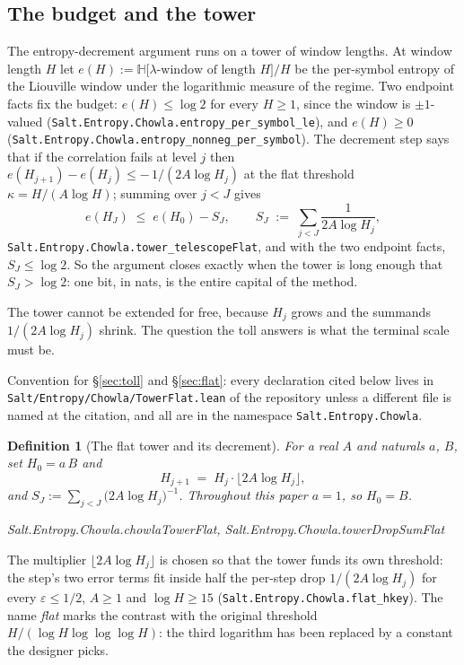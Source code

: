 \documentclass[11pt]{amsart}
\newcommand{\leanname}[1]{\par{\noindent\small\ttfamily\raggedright #1\par}}
\newcommand{\leaninline}[1]{{\small\texttt{#1}}}
\newtheorem{definition}[theorem]{Definition}
\theoremstyle{remark}
\begin{document}
\subsection{The budget and the tower}
The entropy-decrement argument runs on a tower of window lengths. At
window length $H$ let
$e(H) := \mathbb{H}\bigl[\lambda\text{-window of length } H\bigr]/H$
be the per-symbol entropy of the Liouville window under the logarithmic
measure of the regime. Two endpoint facts fix the budget: $e(H) \le \log
2$ for every $H \ge 1$, since the window is $\pm1$-valued
(\leaninline{Salt.Entropy.Chowla.\allowbreak entropy\_per\_symbol\_le}), and $e(H) \ge
0$ (\leaninline{Salt.Entropy.Chowla.\allowbreak entropy\_nonneg\_per\_symbol}). The
decrement step says that if the correlation fails at level $j$ then
$e(H_{j+1}) - e(H_j) \le -\,1/(2A\log H_j)$ at the flat threshold
$\kappa = H/(A\log H)$; summing over $j < J$ gives
\[
e(H_J) \;\le\; e(H_0) - S_J, \qquad
S_J \;:=\; \sum_{j<J} \frac{1}{2A\log H_j},
\]
\leaninline{Salt.Entropy.Chowla.tower\_telescopeFlat}, and with the two
endpoint facts, $S_J \le \log 2$. So the argument closes exactly when the
tower is long enough that $S_J > \log 2$: one bit, in nats, is the entire
capital of the method.

The tower cannot be extended for free, because $H_j$ grows and the
summands $1/(2A\log H_j)$ shrink. The question the toll answers is what
the terminal scale must be.

Convention for \S\ref{sec:toll} and \S\ref{sec:flat}: every declaration
cited below lives in \texttt{Salt/\allowbreak Entropy/\allowbreak Chowla/\allowbreak TowerFlat.lean} of the
repository unless a different file is named at the citation, and all are
in the namespace \leaninline{Salt.Entropy.Chowla}.

\begin{definition}[The flat tower and its decrement]\label{def:flattower}
For a real $A$ and naturals $a$, $B$, set $H_0 = a\,B$ and
\[
H_{j+1} \;=\; H_j \cdot \bigl\lfloor 2A \log H_j \bigr\rfloor ,
\]
and $S_J := \sum_{j<J} \bigl(2A\log H_j\bigr)^{-1}$. Throughout this paper
$a = 1$, so $H_0 = B$.
\leanname{Salt.Entropy.Chowla.chowlaTowerFlat,
Salt.Entropy.Chowla.towerDropSumFlat}
\end{definition}

The multiplier $\lfloor 2A\log H_j\rfloor$ is chosen so that the tower
funds its own threshold: the step's two error terms fit inside half the
per-step drop $1/(2A\log H_j)$ for every $\varepsilon \le 1/2$, $A \ge 1$
and $\log H \ge 15$
(\leaninline{Salt.Entropy.Chowla.flat\_hkey}). The name \emph{flat} marks
the contrast with the original threshold $H/(\log H \log\log\log H)$: the
third logarithm has been replaced by a constant the designer picks.
\end{document}
